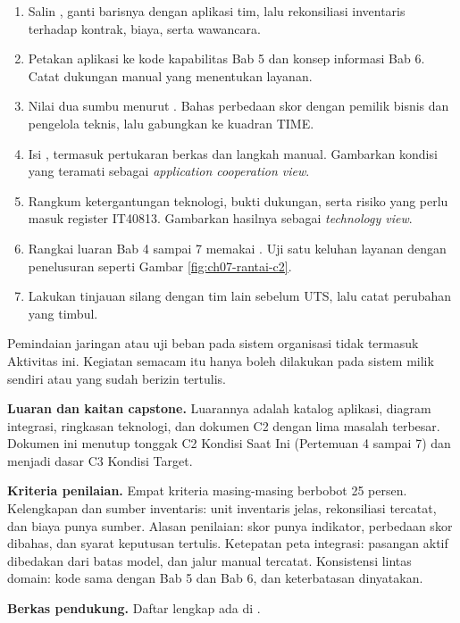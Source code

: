 \begin{enumerate}
  \item Salin , ganti barisnya dengan aplikasi tim, lalu rekonsiliasi inventaris terhadap kontrak, biaya, serta wawancara.
  \item Petakan aplikasi ke kode kapabilitas Bab 5 dan konsep informasi Bab 6. Catat dukungan manual yang menentukan layanan.
  \item Nilai dua sumbu menurut . Bahas perbedaan skor dengan pemilik bisnis dan pengelola teknis, lalu gabungkan ke kuadran TIME.
  \item Isi , termasuk pertukaran berkas dan langkah manual. Gambarkan kondisi yang teramati sebagai \textit{application cooperation view}.
  \item Rangkum ketergantungan teknologi, bukti dukungan, serta risiko yang perlu masuk register IT40813. Gambarkan hasilnya sebagai \textit{technology view}.
  \item Rangkai luaran Bab 4 sampai 7 memakai . Uji satu keluhan layanan dengan penelusuran seperti Gambar \ref{fig:ch07-rantai-c2}.
  \item Lakukan tinjauan silang dengan tim lain sebelum UTS, lalu catat perubahan yang timbul.
\end{enumerate}

Pemindaian jaringan atau uji beban pada sistem organisasi tidak termasuk Aktivitas ini. Kegiatan semacam itu hanya boleh dilakukan pada sistem milik sendiri atau
yang sudah berizin tertulis.

\textbf{Luaran dan kaitan capstone.} Luarannya adalah katalog aplikasi, diagram integrasi, ringkasan teknologi, dan dokumen C2 dengan lima masalah terbesar. Dokumen
ini menutup tonggak C2 Kondisi Saat Ini (Pertemuan 4 sampai 7) dan menjadi dasar C3 Kondisi Target.

\textbf{Kriteria penilaian.} Empat kriteria masing-masing berbobot 25 persen. Kelengkapan dan sumber inventaris: unit inventaris jelas, rekonsiliasi
tercatat, dan biaya punya sumber. Alasan penilaian: skor punya indikator, perbedaan skor dibahas, dan syarat keputusan tertulis. Ketepatan peta integrasi:
pasangan aktif dibedakan dari batas model, dan jalur manual tercatat. Konsistensi lintas domain: kode sama dengan Bab 5 dan Bab 6, dan keterbatasan dinyatakan.

\textbf{Berkas pendukung.} Daftar lengkap ada di .

